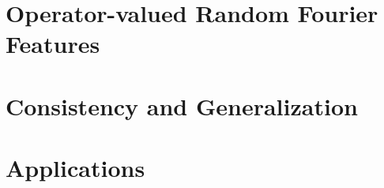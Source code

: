 \chapter{Operator-valued Random Fourier Features}
\label{ch:operator-valued_random_fourier_features}


\chapter{Consistency and Generalization} %
\label{ch:concistency_and_generalization}


\chapter{Applications} %
\label{ch:applications}

